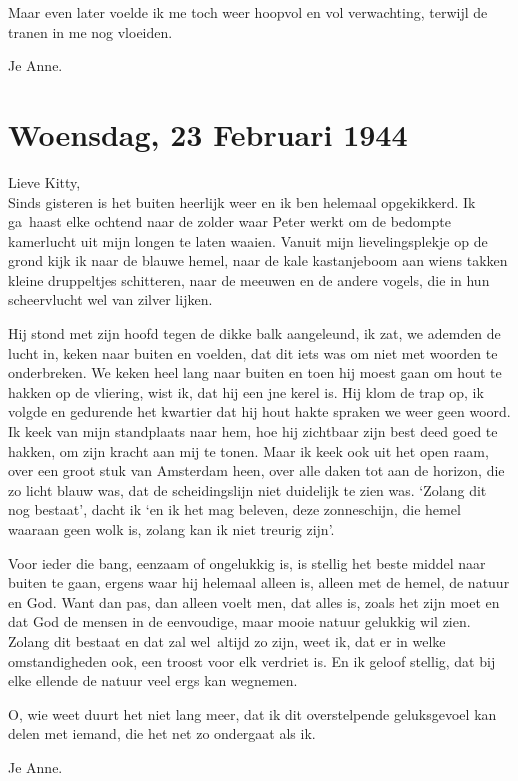 \documentclass{book}
\begin{document}
Maar even later voelde ik me toch weer hoopvol en vol verwachting,
terwijl de tranen in me nog vloeiden.

Je Anne.

\chapter{Woensdag, 23 Februari 1944}

Lieve Kitty,\\Sinds gisteren is het buiten heerlijk weer en ik ben
helemaal opgekikkerd. Ik ga~haast elke ochtend naar de zolder waar Peter
werkt om de bedompte kamerlucht uit mijn longen te laten waaien. Vanuit
mijn lievelingsplekje op de grond kijk ik naar de blauwe hemel, naar de
kale kastanjeboom aan wiens takken kleine druppeltjes schitteren, naar
de meeuwen en de andere vogels, die in hun scheervlucht wel van zilver
lijken.

Hij stond met zijn hoofd tegen de dikke balk aangeleund, ik zat, we
ademden de lucht in, keken naar buiten en voelden, dat dit iets was om
niet met woorden te onderbreken. We keken heel lang naar buiten en toen
hij moest gaan om hout te hakken op de vliering, wist ik, dat hij een
jne kerel is. Hij klom de trap op, ik volgde en gedurende het kwartier
dat hij hout hakte spraken we weer geen woord. Ik keek van mijn
standplaats naar hem, hoe hij zichtbaar zijn best deed goed te hakken,
om zijn kracht aan mij te tonen. Maar ik keek ook uit het open raam,
over een groot stuk van Amsterdam heen, over alle daken tot aan de
horizon, die zo licht blauw was, dat de scheidingslijn niet duidelijk te
zien was. `Zolang dit nog bestaat', dacht ik `en ik het mag beleven,
deze zonneschijn, die hemel waaraan geen wolk is, zolang kan ik niet
treurig zijn'.

Voor ieder die bang, eenzaam of ongelukkig is, is stellig het beste
middel naar buiten te gaan, ergens waar hij helemaal alleen is, alleen
met de hemel, de natuur en God. Want dan pas, dan alleen voelt men, dat
alles is, zoals het zijn moet en dat God de mensen in de eenvoudige,
maar mooie natuur gelukkig wil zien. Zolang dit bestaat en dat zal
wel~altijd zo zijn, weet ik, dat er in welke omstandigheden ook, een
troost voor elk verdriet is. En ik geloof stellig, dat bij elke ellende
de natuur veel ergs kan wegnemen.

O, wie weet duurt het niet lang meer, dat ik dit overstelpende
geluksgevoel kan delen met iemand, die het net zo ondergaat als ik.

Je Anne.
\end{document}
